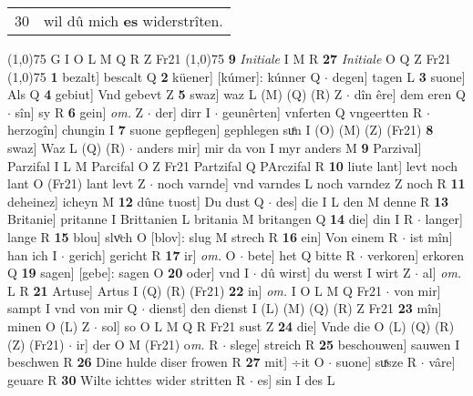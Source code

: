 \documentclass[8pt,a4paper,notitlepage]{article}
\begin{document}
\begin{table}[ht]
\begin{minipage}[t]{0.5\linewidth}
\begin{tabular}{rl}
30 & wil dû mich \textbf{es} widerstrîten.\\ 
\end{tabular}
\scriptsize
\line(1,0){75} \newline
G I O L M Q R Z Fr21 \newline
\line(1,0){75} \newline
\textbf{9} \textit{Initiale} I M R  \textbf{27} \textit{Initiale} O Q Z Fr21  \newline
\line(1,0){75} \newline
\textbf{1} bezalt] bescalt Q \textbf{2} küener] [kúmer]: kúnner Q  $\cdot$ degen] tagen L \textbf{3} suone] Als Q \textbf{4} gebiut] Vnd gebevt Z \textbf{5} swaz] waz L (M) (Q) (R) Z  $\cdot$ dîn êre] dem eren Q  $\cdot$ sîn] sy R \textbf{6} gein] \textit{om.} Z  $\cdot$ der] dirr I  $\cdot$ geunêrten] vnferten Q vngeertten R  $\cdot$ herzogîn] chungin I \textbf{7} suone gepflegen] gephlegen suͤn I (O) (M) (Z) (Fr21) \textbf{8} swaz] Waz L (Q) (R)  $\cdot$ anders mir] mir da von I myr anders M \textbf{9} Parzival] Parzifal I L M Parcifal O Z Fr21 Partzifal Q PArczifal R \textbf{10} liute lant] levt noch lant O (Fr21) lant levt Z  $\cdot$ noch varnde] vnd varndes L noch varndez Z noch R \textbf{11} deheinez] icheyn M \textbf{12} dûne tuost] Du dust Q  $\cdot$ des] die I L den M denne R \textbf{13} Britanie] pritanne I Brittanien L britania M britangen Q \textbf{14} die] din I R  $\cdot$ langer] lange R \textbf{15} blou] slvͦch O [blov]: slug M strech R \textbf{16} ein] Von einem R  $\cdot$ ist mîn] han ich I  $\cdot$ gerich] gericht R \textbf{17} ir] \textit{om.} O  $\cdot$ bete] het Q bitte R  $\cdot$ verkoren] erkoren Q \textbf{19} sagen] [gebe]: sagen O \textbf{20} oder] vnd I  $\cdot$ dû wirst] du werst I wirt Z  $\cdot$ al] \textit{om.} L R \textbf{21} Artuse] Artus I (Q) (R) (Fr21) \textbf{22} in] \textit{om.} I O L M Q Fr21  $\cdot$ von mir] sampt I vnd von mir Q  $\cdot$ dienst] den dienst I (L) (M) (Q) (R) Z Fr21 \textbf{23} mîn] minen O (L) Z  $\cdot$ sol] so O L M Q R Fr21 sust Z \textbf{24} die] Vnde die O (L) (Q) (R) (Z) (Fr21)  $\cdot$ ir] der O M (Fr21) o\textit{m. } R  $\cdot$ slege] streich R \textbf{25} beschouwen] sauwen I beschwen R \textbf{26} Dine hulde diser frowen R \textbf{27} mit] ÷it O  $\cdot$ suone] suͯsze R  $\cdot$ vâre] geuare R \textbf{30} Wilte ichttes wider stritten R  $\cdot$ es] sin I des L \newline
\end{minipage}
\hspace{0.5cm}
\begin{minipage}[t]{0.5\linewidth}

\end{minipage}
\end{table}
\end{document}
